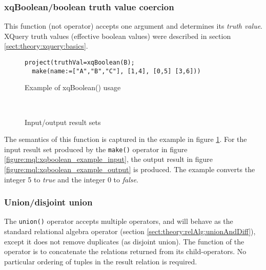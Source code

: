 \subsubsection{xqBoolean/boolean truth value coercion}

This function (not operator) accepts one argument and determines its \textit{truth value}. XQuery truth values
(effective boolean values) were described in section \ref{sect:theory:xquery:basics}.

\begin{figure}[!h]
\centering
\begin{Verbatim}
project(truthVal=xqBoolean(B); 
  make(name:=["A","B","C"], [1,4], [0,5] [3,6]))
\end{Verbatim}
\caption{Example of xqBoolean() usage}
\label{figure:mql:xqboolean_example}
\end{figure}

\begin{figure}[!h]
\centering
\mbox{
\quad
{}
}
\caption{Input/output result sets}
\end{figure}

The semantics of this function is captured in the example in figure
\ref{figure:mql:xqboolean_example}. For the input result set produced by the
\texttt{make()} operator in figure \ref{figure:mql:xqboolean_example_input},
the output result in figure \ref{figure:mql:xqboolean_example_output} is
produced. The example converts the integer 5 to \textit{true} and the integer 0
to \textit{false}. 

\subsubsection{Union/disjoint union}
The \texttt{union()} operator accepts multiple operators, and will behave as the standard relational algebra
operator (section \ref{sect:theory:relAlg:unionAndDiff}), except it does not remove duplicates (as disjoint
union). The function of the operator is to concatenate the relations returned from its child-operators. No
particular ordering of tuples in the result relation is required.
